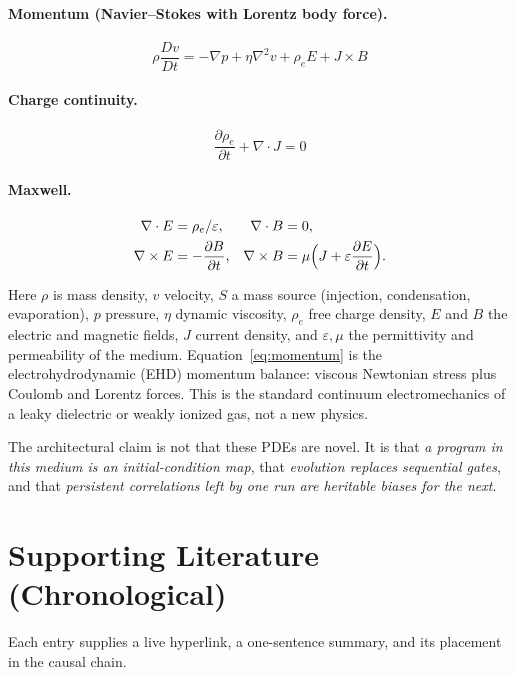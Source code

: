 \documentclass[11pt,a4paper]{article}
\begin{document}
\paragraph{Momentum (Navier--Stokes with Lorentz body force).}
\begin{equation}
\rho\frac{Dv}{Dt} = -\nabla p + \eta\nabla^{2}v + \rho_{e}E + J\times B
\label{eq:momentum}
\end{equation}

\paragraph{Charge continuity.}
\begin{equation}
\frac{\partial\rho_{e}}{\partial t} + \nabla\cdot J = 0
\label{eq:charge}
\end{equation}

\paragraph{Maxwell.}
\begin{align}
\nabla\cdot E &= \rho_{e}/\varepsilon, &
\nabla\cdot B &= 0, \nonumber\\
\nabla\times E &= -\frac{\partial B}{\partial t}, &
\nabla\times B &= \mu\Bigl(J + \varepsilon\frac{\partial E}{\partial t}\Bigr).
\label{eq:maxwell}
\end{align}

Here $\rho$ is mass density, $v$ velocity, $S$ a mass source (injection, condensation, evaporation), $p$ pressure, $\eta$ dynamic viscosity, $\rho_{e}$ free charge density, $E$ and $B$ the electric and magnetic fields, $J$ current density, and $\varepsilon,\mu$ the permittivity and permeability of the medium. Equation~\eqref{eq:momentum} is the electrohydrodynamic (EHD) momentum balance: viscous Newtonian stress plus Coulomb and Lorentz forces. This is the standard continuum electromechanics of a leaky dielectric or weakly ionized gas, not a new physics.

The architectural claim is not that these PDEs are novel. It is that \emph{a program in this medium is an initial-condition map}, that \emph{evolution replaces sequential gates}, and that \emph{persistent correlations left by one run are heritable biases for the next}.

\section{Supporting Literature (Chronological)}
Each entry supplies a live hyperlink, a one-sentence summary, and its placement in the causal chain.
\end{document}
